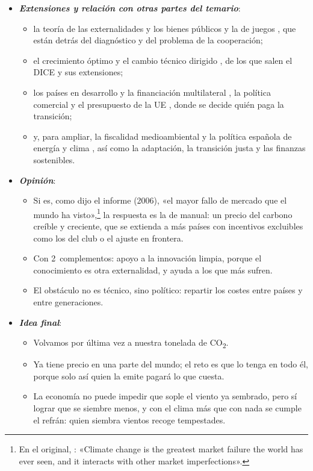 \documentclass[11pt]{article}
\begin{document}
\begin{itemize}
\item \textbf{\emph{Extensiones y relación con otras partes del temario}}:
  \begin{itemize}
  \item la teoría de las externalidades y los bienes públicos  y la de juegos , que están detrás del diagnóstico y del problema de la cooperación;
  \item el crecimiento óptimo y el cambio técnico dirigido  , de los que salen el DICE y sus extensiones;
  \item los países en desarrollo y la financiación multilateral  , la política comercial  y el presupuesto de la UE , donde se decide quién paga la transición;
  \item y, para ampliar, la fiscalidad medioambiental  y la política española de energía y clima , así como la adaptación, la transición justa y las finanzas sostenibles.
  \end{itemize}

\item \textbf{\emph{Opinión}}:
  \begin{itemize}
  \item Si es, como dijo el informe  (2006), «el mayor fallo de mercado que el mundo ha visto»,\footnote{En el original, \textcite{HMT2006SternResumen}: «Climate change is the greatest market failure the world has ever seen, and it interacts with other market imperfections».} la respuesta es la de manual: un precio del carbono creíble y creciente, que se extienda a más países con incentivos excluibles como los del club o el ajuste en frontera.
  \item Con 2~complementos: apoyo a la innovación limpia, porque el conocimiento es otra externalidad, y ayuda a los que más sufren.
  \item El obstáculo no es técnico, sino político: repartir los costes entre países y entre generaciones.
  \end{itemize}
\item \textbf{\emph{Idea final}}:
  \begin{itemize}
  \item Volvamos por última vez a nuestra tonelada de CO\textsubscript{2}.

  \item Ya tiene precio en una parte del mundo; el reto es que lo tenga en todo él, porque solo así quien la emite pagará lo que cuesta.

  \item La economía no puede impedir que sople el viento ya sembrado, pero sí lograr que se siembre menos, y con el clima más que con nada se cumple el refrán: quien siembra vientos recoge tempestades.
  \end{itemize}
\end{itemize}
\end{document}
